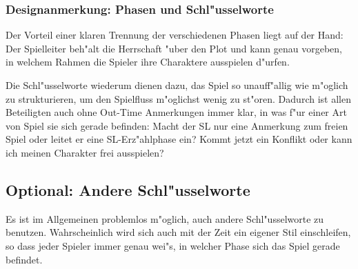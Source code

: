\begin{design}
\subsubsection{Designanmerkung: Phasen und Schl"usselworte}

Der Vorteil einer klaren Trennung der verschiedenen Phasen liegt auf der Hand: Der Spielleiter beh"alt die Herrschaft "uber den Plot und kann genau vorgeben, in welchem Rahmen die Spieler ihre Charaktere ausspielen d"urfen.

Die Schl"usselworte wiederum dienen dazu, das Spiel so unauff"allig wie m"oglich zu strukturieren, um den Spielfluss m"oglichst wenig zu st"oren. Dadurch ist allen Beteiligten auch ohne Out-Time Anmerkungen immer klar, in was f"ur einer Art von Spiel sie sich gerade befinden: Macht der SL nur eine Anmerkung zum freien Spiel oder leitet er eine SL-Erz"ahlphase ein? Kommt jetzt ein Konflikt oder kann ich meinen Charakter frei ausspielen?
\end{design}

\begin{optional}
\section{Optional: Andere Schl"usselworte}

Es ist im Allgemeinen problemlos m"oglich, auch andere Schl"usselworte zu benutzen. Wahrscheinlich wird sich auch mit der Zeit ein eigener Stil einschleifen, so dass jeder Spieler immer genau wei"s, in welcher Phase sich das Spiel gerade befindet.
\end{optional}


